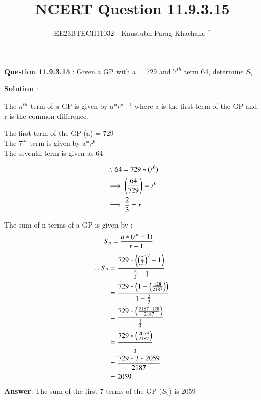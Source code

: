 \documentclass[journal,12pt,twocolumn]{IEEEtran}
\theoremstyle{remark}
\begin{document}

\vspace{3cm}

\Large\title{NCERT Question 11.9.3.15}
\large\author{EE23BTECH11032 - Kaustubh Parag Khachane $^{*}$%
}
\maketitle
\newpage
\bigskip

\renewcommand{\thefigure}{\theenumi}
\renewcommand{\thetable}{\theenumi}
\large\textbf{Question 11.9.3.15} : Given a GP with a = 729 and \(7^{th}\) term 64, determine $S_{7}$

\vspace{4mm} 

\large\textbf{Solution} :\normalsize

\vspace{4mm} 

The \(n^{th}\) term of a GP is given by a*\(r^{n-1}\) where a is the first term of the GP and r is the common difference.

\vspace{4mm}

The first term of the GP (a) = 729\\
The \(7^{th}\) term is given by a*\(r^{6}\)\\
The seventh term is given as 64

\begin{align}
&\therefore  64 = 729*(r^{6})\notag\\
&\implies \left(\frac{64}{729}\right) = r^6\notag\\
&\implies \frac{2}{3} = r \notag
\end{align}

The sum of n terms of a GP is given by :
\begin{align}
&S_{n} = \Large\frac{a*(r^n - 1)}{r-1} \notag
\end{align}
\begin{equation} \label{eq1}
\begin{split}
\therefore S_{7} & = \frac{729*\left(\left(\frac{2}{3}\right)^7 -1\right)}{\frac{2}{3} - 1} \notag\\
 & = \frac{729*\left(1 - \left(\frac{128}{2187}\right)\right)}{1 - \frac{2}{3}} \notag\\
  & = \frac{729*\left(\frac{2187 - 128}{2187}\right)}{\frac{1}{3}}\notag\\
  & = \frac{729*\left(\frac{2059}{2187}\right)}{\frac{1}{3}}\notag\\
  & = \frac{729*3*2059}{2187}\notag\\
  & = 2059\notag
\end{split}
\end{equation}
\large\textbf{Answer}: \normalsize The sum of the first 7 terms of the GP ($S_{7}$) is 2059
\end{document}
